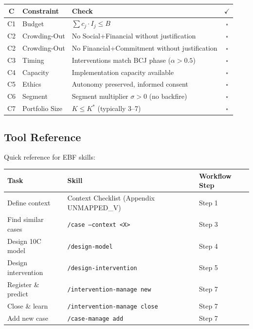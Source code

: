 \begin{tcolorbox}[colback=red!5!white,colframe=red!75!black,
    title=\textbf{Portfolio Validation Checklist (C1--C7)}]
\small
\begin{tabular}{|c|l|l|c|}
\hline
\textbf{C} & \textbf{Constraint} & \textbf{Check} & $\checkmark$ \\
\hline
C1 & Budget & $\sum c_j \cdot I_j \leq B$ & $\square$ \\
C2 & Crowding-Out & No Social+Financial without justification & $\square$ \\
C2 & Crowding-Out & No Financial+Commitment without justification & $\square$ \\
C3 & Timing & Interventions match BCJ phase ($\alpha > 0.5$) & $\square$ \\
C4 & Capacity & Implementation capacity available & $\square$ \\
C5 & Ethics & Autonomy preserved, informed consent & $\square$ \\
C6 & Segment & Segment multiplier $\sigma > 0$ (no backfire) & $\square$ \\
C7 & Portfolio Size & $K \leq K^*$ (typically 3--7) & $\square$ \\
\hline
\end{tabular}
\end{tcolorbox}

\subsection{Tool Reference}
\label{sec:25-tools}

Quick reference for EBF skills:

\begin{center}
\begin{tabular}{|l|l|l|}
\hline
\textbf{Task} & \textbf{Skill} & \textbf{Workflow Step} \\
\hline
Define context & Context Checklist (Appendix UNMAPPED_V) & Step 1 \\
Find similar cases & \texttt{/case --context <X>} & Step 3 \\
Design 10C model & \texttt{/design-model} & Step 4 \\
Design intervention & \texttt{/design-intervention} & Step 5 \\
Register \& predict & \texttt{/intervention-manage new} & Step 7 \\
Close \& learn & \texttt{/intervention-manage close} & Step 7 \\
Add new case & \texttt{/case-manage add} & Step 7 \\
\hline
\end{tabular}
\end{center}


